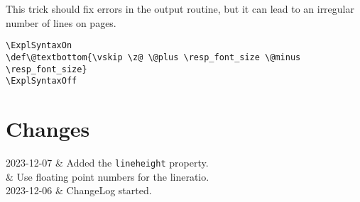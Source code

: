 \documentclass{ltxdoc}
\makeatletter
\newenvironment{changelog}{\longtable{@{} l p{30em}}}{\endlongtable}
\newcommand\change[2]{#1 & #2\\}
\makeatother
\begin{document}
This trick should fix \cmd{\vbox} errors in the output routine, but it can lead 
to an irregular number of lines on pages.


\begin{verbatim}
\ExplSyntaxOn
\def\@textbottom{\vskip \z@ \@plus \resp_font_size \@minus \resp_font_size}
\ExplSyntaxOff
\end{verbatim}

\section{Changes}

\begin{changelog}
  \change{2023-12-07}{Added the \texttt{lineheight} property.}
  \change{}{Use floating point numbers for the lineratio.}
  \change{2023-12-06}{ChangeLog started.}
\end{changelog}
\end{document}
